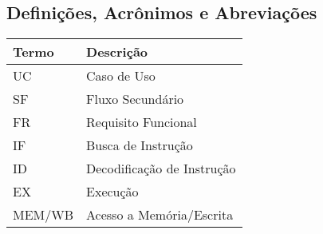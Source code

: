   \subsection{Definições, Acrônimos e Abreviações}
  \FloatBarrier
    \begin{table}[H] 
      \begin{center}
        \begin{tabular}[pos]{|m{2cm} | m{8cm}|} 
          \hline \cellcolor[gray]{0.9}\textbf{Termo} & \cellcolor[gray]{0.9}\textbf{Descrição} \\ \hline
          UC & Caso de Uso  \\ \hline
          SF & Fluxo Secundário \\ \hline
          FR & Requisito Funcional \\ \hline
          IF & Busca de Instrução \\ \hline
          ID & Decodificação de Instrução \\ \hline 
          EX & Execução \\ \hline 
          MEM/WB & Acesso a Memória/Escrita \\ \hline
        \end{tabular}
      \end{center}
    \label{tab:definicoes}
    \end{table}